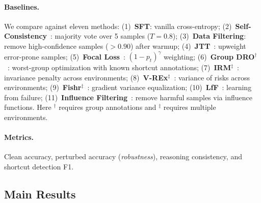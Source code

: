 \paragraph{Baselines.}
We compare against eleven methods:
(1)~\textbf{SFT}: vanilla cross-entropy;
(2)~\textbf{Self-Consistency}~\cite{wang2023selfconsistency}: majority vote over 5 samples ($T{=}0.8$);
(3)~\textbf{Data Filtering}: remove high-confidence samples ($> 0.90$) after warmup;
(4)~\textbf{JTT}~\cite{liu2021just}: upweight error-prone samples;
(5)~\textbf{Focal Loss}~\cite{lin2017focal}: $(1{-}p_t)^\gamma$ weighting;
(6)~\textbf{Group DRO}$^\dagger$~\cite{sagawa2020distributionally}: worst-group optimization with known shortcut annotations;
(7)~\textbf{IRM}$^\ddagger$~\cite{arjovsky2019invariant}: invariance penalty across environments;
(8)~\textbf{V-REx}$^\ddagger$~\cite{krueger2021out}: variance of risks across environments;
(9)~\textbf{Fishr}$^\ddagger$~\cite{rame2022fishr}: gradient variance equalization;
(10)~\textbf{LfF}~\cite{nam2020learning}: learning from failure;
(11)~\textbf{Influence Filtering}~\cite{koh2017understanding}: remove harmful samples via influence functions.
Here $^\dagger$ requires group annotations and $^\ddagger$ requires multiple environments.

\paragraph{Metrics.}
Clean accuracy, perturbed accuracy (\emph{robustness}), reasoning consistency, and shortcut detection F1.

\subsection{Main Results}
\label{sec:exp_main}

